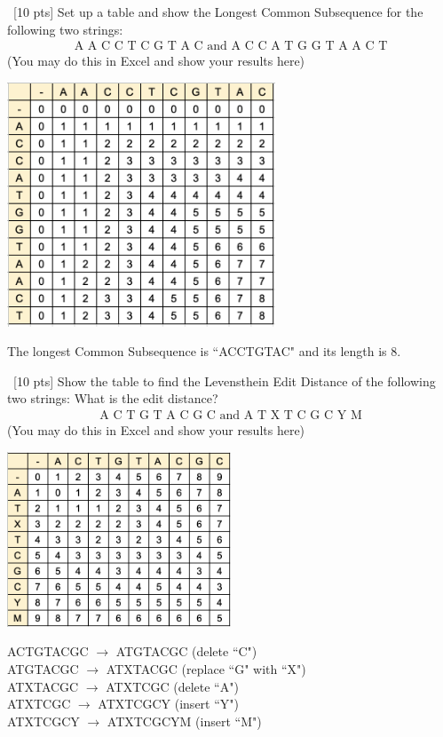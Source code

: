\documentclass[12pt]{article}
\newenvironment{sol}[1][Solution]{\begin{trivlist}\item[\hskip\labelsep {\bfseries #1:}]}{\end{trivlist}}
\begin{document}
\begin{enumerate}
    \item \ [10 pts] Set up a table and show the Longest Common Subsequence for the following two strings:
    \begin{align*}
        \text{A \ A \ C \ C \ T \ C \ G \ T \ A \ C and \ A \ C \ C \ A \ T \ G \ G \ T \ A \ A \ C \ T}
    \end{align*}
    (You may do this in Excel and show your results here)
    \begin{sol}
    \hspace*{\fill}
    \begin{center}
        \includegraphics[width=0.6\textwidth]{p1.png}
    \end{center}
    \end{sol}
     The longest Common Subsequence is ``ACCTGTAC" and its length is 8.

    \item \ [10 pts] Show the table to find the Levensthein Edit Distance of the following two strings: What is the edit distance?
        \begin{align*}
        \text{A \ C \ T \ G \ T \ A \ C \ G \ C and \ A \ T \ X \ T \ C \ G \ C \ Y \ M}
    \end{align*}
    (You may do this in Excel and show your results here)
    \begin{sol}
        \hspace*{\fill}
            \begin{center}
        \includegraphics[width=0.5\textwidth]{p2.png}
    \end{center}
    ACTGTACGC $\rightarrow$ ATGTACGC (delete ``C")\\
    ATGTACGC $\rightarrow$ ATXTACGC (replace ``G" with ``X")\\
    ATXTACGC $\rightarrow$ ATXTCGC (delete ``A")\\
    ATXTCGC $\rightarrow$ ATXTCGCY (insert ``Y")\\
    ATXTCGCY $\rightarrow$ ATXTCGCYM (insert ``M")\\
     

\end{sol}
\end{enumerate}
\end{document}
